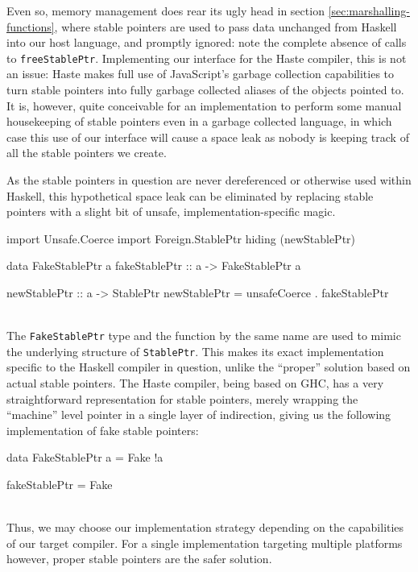 \documentclass[preprint]{sigplanconf}
\begin{document}
Even so, memory management does rear its ugly head in section
\ref{sec:marshalling-functions}, where stable pointers are used to pass data
unchanged from Haskell into our host language, and promptly ignored: note
the complete absence of calls to \lstinline!freeStablePtr!. Implementing our
interface for the Haste compiler, this is not an issue: Haste makes full use
of JavaScript's garbage collection capabilities to turn stable pointers into
fully garbage collected aliases of the objects pointed to.
It is, however, quite conceivable for an implementation to perform some manual
housekeeping of stable pointers even in a garbage collected language, in which
case this use of our interface will cause a space leak as nobody is keeping
track of all the stable pointers we create.

As the stable pointers in question are never dereferenced or otherwise
used within Haskell, this hypothetical space leak can be eliminated by
replacing stable pointers with a slight bit of unsafe, implementation-specific
magic.\\
\begin{code}
  import Unsafe.Coerce
  import Foreign.StablePtr hiding (newStablePtr)

  data FakeStablePtr a
  fakeStablePtr :: a -> FakeStablePtr a

  newStablePtr :: a -> StablePtr
  newStablePtr = unsafeCoerce . fakeStablePtr
\end{code}\\
The \lstinline!FakeStablePtr! type and the function by the same name are used
to mimic the underlying structure of \lstinline!StablePtr!. This makes its
exact implementation specific to the Haskell compiler in question, unlike
the ``proper'' solution based on actual stable pointers. The Haste
compiler, being based on GHC, has a very straightforward representation for
stable pointers, merely wrapping the ``machine'' level pointer in a single
layer of indirection, giving us the following implementation of fake stable
pointers:\\
\begin{code}
  data FakeStablePtr a = Fake !a

  fakeStablePtr = Fake
\end{code}\\
Thus, we may choose our implementation strategy depending on the capabilities
of our target compiler. For a single implementation targeting multiple
platforms however, proper stable pointers are the safer solution.
\end{document}
